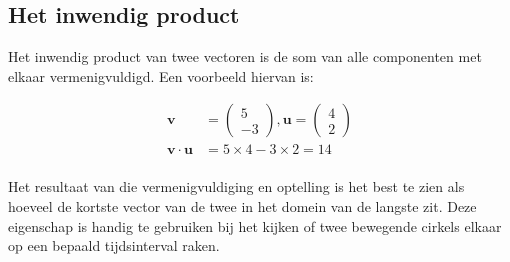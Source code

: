 \documentclass[12pt,a4paper]{article}
\begin{document}
	\subsection{Het inwendig product}
	Het inwendig product van twee vectoren is de som van alle componenten met elkaar vermenigvuldigd. Een voorbeeld hiervan is:
	
	\begin{equation*}
		\begin{aligned}
			\mathbf{v} &= \begin{pmatrix} 5 \\ -3 \end{pmatrix}, \mathbf{u} = \begin{pmatrix} 4 \\ 2 \end{pmatrix} \\
			\mathbf{v} \cdot \mathbf{u} &= 5 \times 4 -3 \times 2 = 14\\
		\end{aligned}
	\end{equation*}
	
	Het resultaat van die vermenigvuldiging en optelling is het best te zien als hoeveel de kortste vector van de twee in het domein van de langste zit. Deze eigenschap is handig te gebruiken bij het kijken of twee bewegende cirkels elkaar op een bepaald tijdsinterval raken.
	
\end{document}
